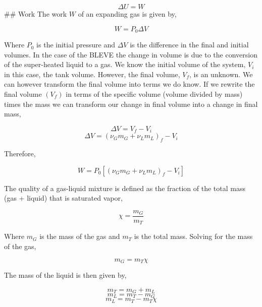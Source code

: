 \documentclass[10pt,parskip=half,
toc=sectionentrywithdots,
bibliography=totocnumbered,
captions=tableheading,numbers=noendperiod]{scrartcl}
\begin{document}
\begin{equation}\Delta U = W\end{equation} \#\# Work The work \(W\) of
an expanding gas is given by,

\begin{equation}W = P_0\Delta V\end{equation}

Where \(P_0\) is the initial pressure and \(\Delta V\) is the difference
in the final and initial volumes. In the case of the BLEVE the change in
volume is due to the conversion of the super-heated liquid to a gas. We
know the initial volume of the system, \(V_i\) in this case, the tank
volume. However, the final volume, \(V_f\), is an unknown. We can
however transform the final volume into terms we do know. If we rewrite
the final volume \((V_f)\) in terms of the specific volume (volume
divided by mass) times the mass we can transform our change in final
volume into a change in final mass,

\begin{equation}\Delta V =  V_f - V_i\end{equation}
\begin{equation}\Delta V =  \left(\nu_Gm_G + \nu_Lm_L \right)_f - V_i\end{equation}

Therefore,

\begin{equation}W = P_0\left[\left(\nu_Gm_G + \nu_Lm_L \right)_f - V_i\right]\end{equation}

The quality of a gas-liquid mixture is defined as the fraction of the
total mass (gas + liquid) that is saturated vapor,

\begin{equation}\chi = \frac{m_G}{m_T}\end{equation}

Where \(m_G\) is the mass of the gas and \(m_T\) is the total mass.
Solving for the mass of the gas,

\begin{equation}m_G = m_T \chi\end{equation}

The mass of the liquid is then given by,

\begin{equation}m_T = m_G + m_L\end{equation}
\begin{equation}m_L = m_T - m_G\end{equation}
\begin{equation}m_L = m_T - m_T \chi\end{equation}
\end{document}

